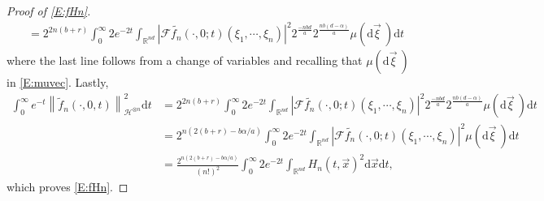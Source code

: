 \documentclass[a4paper,11pt]{article}
\numberwithin{equation}{section}
\numberwithin{equation}{section}
\theoremstyle{plain}
\theoremstyle{definition}
\newcommand{\ud}{\ensuremath{\mathrm{d} }}
\newcommand{\Norm}[1]{\left\|  #1   \right\|}
\newcommand{\R}{\mathbb{R}}
\begin{document}
\begin{proof}[Proof of \eqref{E:fHn}]
\begin{align*}
    & = 2^{2n(b+r)}\int_0^\infty 2e^{-2t} \int_{\R^{nd}} \left| \mathcal{F}\widetilde{f_n}(\cdot,0;t)(\xi_1,\cdots,\xi_n) \right|^2 2^{\frac{-nbd}{a}} 2^{\frac{nb(d-\alpha)}{a}} \mu(\ud \vec{\xi}\:)   \ud t
  \end{align*}
   where the last line follows from a change of variables and recalling that $\mu(\ud \vec{\xi}\:)$
   in \eqref{E:muvec}. Lastly,
    \begin{align*}
      \int_0^\infty e^{-t} \Norm{ \widetilde{f}_n(\cdot,0,t) }_{\mathcal{H}^{\otimes n}}^2 \ud t
    & = 2^{2n(b+r)}\int_0^\infty 2e^{-2t} \int_{\R^{nd}} \left| \mathcal{F}\widetilde{f_n}(\cdot,0;t)(\xi_1,\cdots,\xi_n) \right|^2 2^{\frac{-nbd}{a}} 2^{\frac{nb(d-\alpha)}{a}} \mu(\ud \vec{\xi}\:) \ud t \\
    & = 2^{n(2(b+r) - b\alpha/a)}  \int_0^\infty 2e^{-2t} \int_{\R^{nd}} \left| \mathcal{F}\widetilde{f_n}(\cdot,0;t)(\xi_1,\cdots,\xi_n) \right|^2 \mu(\ud \vec{\xi}\:)   \ud t                             \\
    & = \frac{2^{n(2(b+r) - b\alpha/a)}}{(n!)^2}  \int_0^\infty 2e^{-2t} \int_{\R^{nd}} H_n(t,\vec{x})^2 \ud \vec{x}   \ud t,
  \end{align*}
  which proves \eqref{E:fHn}.
\end{proof}

\bigskip
\end{document}
